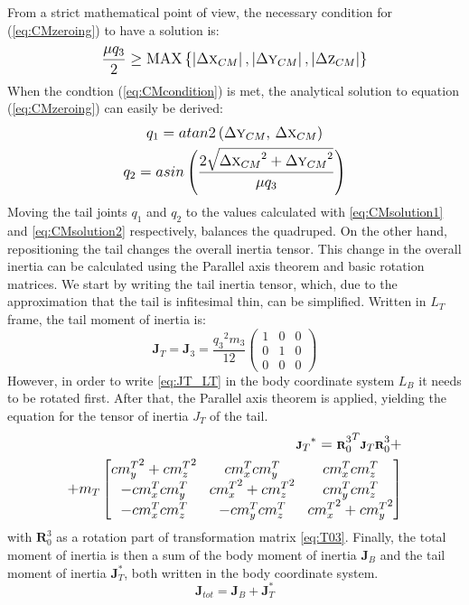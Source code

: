 From a strict mathematical point of view, the necessary condition for (\ref{eq:CMzeroing}) to have a solution is:
\begin{equation}\label{eq:CMcondition}
\frac{\mu q_3}{2}\geq \textup{MAX}\left \{ \left | \Delta \textsc{x}_{CM} \right |, \left | \Delta \textsc{y}_{CM} \right |,\left | \Delta \textsc{z}_{CM} \right |\right \}
\end{equation}
When the condtion (\ref{eq:CMcondition}) is met, the analytical solution to equation (\ref{eq:CMzeroing}) can easily be derived:
\begin{gather}\label{eq:CMsolution1}
q_1=atan2\left({\Delta \textsc{y}_{CM}},\, {\Delta \textsc{x}_{CM}}\right)\\
q_2=asin\left(\frac{2\sqrt{{\Delta \textsc{x}_{CM}}^2+{\Delta \textsc{y}_{CM}}^2}}{\mu q_3} \right)\label{eq:CMsolution2}
\end{gather}
Moving the tail joints $q_1$ and $q_2$ to the values calculated with \eqref{eq:CMsolution1} and \eqref{eq:CMsolution2} respectively, balances the quadruped. On the other hand, repositioning the tail changes the overall inertia tensor. This change in the overall inertia can be calculated using the Parallel axis theorem and basic rotation matrices. We start by writing the tail inertia tensor, which, due to the approximation that the tail is infitesimal thin, can be simplified. Written in $L_T$ frame, the tail moment of inertia is:
\begin{equation}\label{eq:JT_LT}
\textbf{J}_T=\textbf{J}_3=\frac{{q_3}^2 m_3}{12}\left(
\begin{array}{ccc}
 1 & 0 & 0 \\
 0 & 1 & 0 \\
 0 & 0 & 0
\end{array}
\right)
\end{equation}
However, in order to write \eqref{eq:JT_LT} in the body coordinate system $L_B$ it needs to be rotated first. After that, the Parallel axis theorem is applied, yielding the equation for the tensor of inertia $J_T$ of the tail. 
\begin{equation}
\begin{aligned}
\scriptsize
{\textbf{J}_T}^*={\textbf{R}_0^3}^T\textbf{J}_T\textbf{R}_0^3+\\+m_T\begin{bmatrix}
{cm_y^T}^2 +{cm_z^T}^2& {cm_x^T}{cm_y^T}& {cm_x^T}{cm_z^T} \\ 
-{cm_x^T}{cm_y^T} & {cm_x^T}^2+{cm_z^T}^2 & {cm_y^T}{cm_z^T}\\ 
-{cm_x^T}{cm_z^T} & -{cm_y^T}{cm_z^T} & {cm_x^T}^2+{cm_y^T}^2
\end{bmatrix}
\normalsize
\end{aligned}
\end{equation}
with $\textbf{R}_0^3$ as a rotation part of transformation matrix \eqref{eq:T03}. Finally, the total moment of inertia is then a sum of the body moment of inertia $\textbf{J}_B$ and the tail moment of inertia $\textbf{J}_T^*$, both written in the body coordinate system.
\begin{equation*}
\textbf{J}_{tot}=\textbf{J}_B+\textbf{J}_T^*
\end{equation*}
